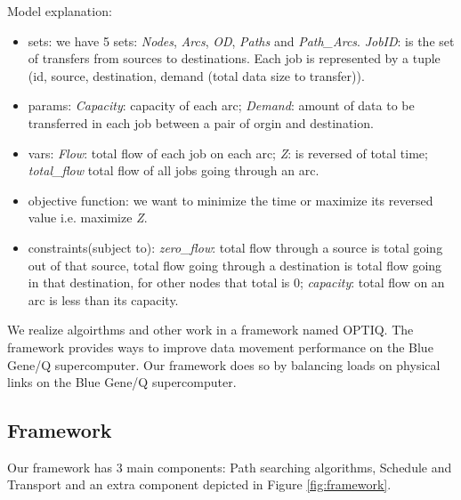 \endgroup

Model explanation:
\begin{itemize}
\item sets: we have 5 sets: \textit{Nodes}, \textit{Arcs}, \textit{OD}, \textit{Paths} and \textit{Path\_Arcs}. \textit{JobID}: is the set of transfers from sources to destinations. Each job is represented by a tuple (id, source, destination, demand (total data size to transfer)).
\item params: {\it Capacity}: capacity of each arc; {\it Demand}: amount of data to be transferred in each job between a pair of orgin and destination.
\item vars: \textit{Flow}: total flow of each job on each arc; \textit{Z}: is reversed of total time; \textit{total\_flow} total flow of all jobs going through an arc.
\item objective function: we want to minimize the time or maximize its reversed value i.e. maximize \textit{Z}.
\item constraints(subject to): \textit{zero\_flow}: total flow through a source is total going out of that source, total flow going through a destination is total flow going in that destination, for other nodes that total is 0; \textit{capacity}: total flow on an arc is less than its capacity.
\end{itemize}

We realize algoirthms and other work in a framework named OPTIQ. The framework provides ways to improve data movement performance on the Blue Gene/Q supercomputer. Our framework does so by balancing loads on physical links on the Blue Gene/Q supercomputer.

\subsection{Framework}

Our framework has 3 main components: Path searching algorithms, Schedule and Transport and an extra component depicted in Figure \ref{fig:framework}.

